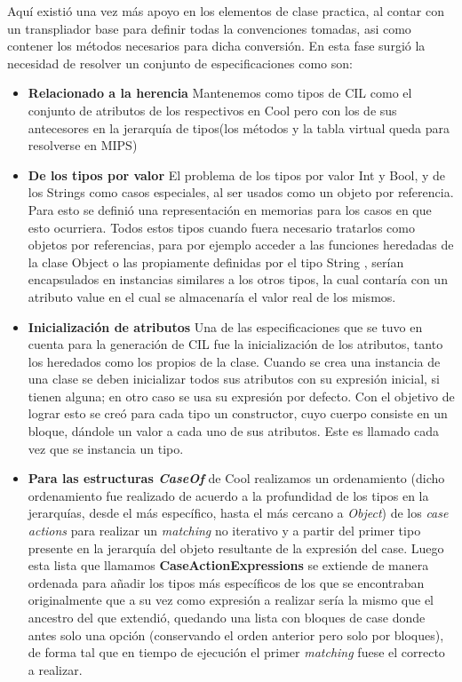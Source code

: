 \documentclass[a4paper,10pt,twocolumn]{article}
\begin{document}
  Aquí existió una vez más apoyo en los elementos de clase practica, al contar con un transpliador base para definir todas la convenciones tomadas, asi como contener los métodos necesarios para dicha conversión.
 En esta fase surgió la necesidad de resolver  un conjunto de especificaciones como son: 
	\begin{itemize}
		\item \textbf{Relacionado a la herencia} Mantenemos como tipos de CIL como el conjunto de atributos de los respectivos en Cool pero con los de sus antecesores en la jerarqu\'ia de tipos(los m\'etodos y la tabla virtual queda para resolverse en MIPS)
		\item \textbf{De los tipos por valor} El problema de los tipos por valor  Int y	Bool, y de los  Strings como casos especiales, al ser usados como un objeto por referencia. Para esto se definió una representación en memorias para los casos en
		que esto ocurriera. Todos estos tipos cuando fuera necesario tratarlos como objetos
		por referencias, para por ejemplo acceder a las funciones heredadas de la clase
		Object o las propiamente definidas por el tipo String , serían encapsulados en
		instancias similares a los otros tipos, la cual contaría con un atributo value en el cual
		se almacenaría el valor real de los mismos.
		\item \textbf{Inicializaci\'on de atributos} Una de las especificaciones que se tuvo en cuenta para la generación de CIL fue la inicialización
		de los atributos, tanto los heredados como los propios de la clase. Cuando se crea una instancia
		de una clase se deben inicializar todos sus atributos con su expresión inicial, si tienen alguna;
		en otro caso se usa su expresión por defecto. Con el objetivo de lograr esto se creó para cada
		tipo un constructor, cuyo cuerpo consiste en un bloque, dándole un valor a cada uno de sus
		atributos. Este es llamado cada vez que se instancia un tipo.
		\item \textbf{Para las estructuras \textit{CaseOf}} de Cool realizamos un ordenamiento (dicho ordenamiento fue realizado de acuerdo a la profundidad de los tipos en la jerarqu\'ias, desde el m\'as espec\'ifico, hasta el más cercano a \textit{Object}) de los \textit{case actions} para realizar un \textit{matching} no iterativo y a partir del primer tipo presente en la jerarqu\'ia del objeto resultante de la expresi\'on del case.
		Luego esta lista que llamamos \textbf{CaseActionExpressions} se extiende de manera ordenada para a\~nadir los tipos más espec\'ificos de los que se encontraban originalmente que a su vez como expresi\'on a realizar ser\'ia la mismo que el ancestro del que extendió, quedando una lista con bloques de case donde antes solo una opci\'on (conservando el orden anterior pero solo por bloques), de forma tal que en tiempo de ejecuci\'on el primer \textit{matching} fuese el correcto a realizar.
	\end{itemize}
\end{document}
